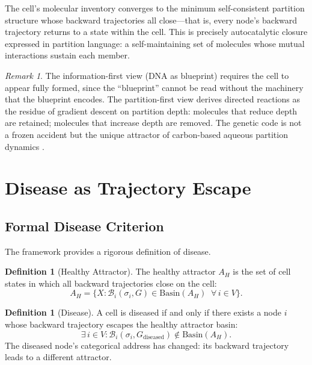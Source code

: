 \documentclass[twocolumn,10pt,a4paper]{article}
\theoremstyle{definition}
\newtheorem{definition}[theorem]{Definition}
\theoremstyle{remark}
\newtheorem{remark}[theorem]{Remark}
\newcommand{\Back}{\mathcal{B}}
\begin{document}
The cell's molecular inventory converges to the minimum self-consistent partition structure whose backward trajectories all close---that is, every node's backward trajectory returns to a state within the cell. This is precisely autocatalytic closure \citep{Kauffman1993,VarelaMaturanaUribe1974} expressed in partition language: a self-maintaining set of molecules whose mutual interactions sustain each member.

\begin{remark}
The information-first view (DNA as blueprint) requires the cell to appear fully formed, since the ``blueprint'' cannot be read without the machinery that the blueprint encodes. The partition-first view derives directed reactions as the residue of gradient descent on partition depth: molecules that reduce depth are retained; molecules that increase depth are removed. The genetic code is not a frozen accident but the unique attractor of carbon-based aqueous partition dynamics \citep{Sachikonye2024c}.
\end{remark}

\section{Disease as Trajectory Escape}
\label{sec:disease}

\subsection{Formal Disease Criterion}

The framework provides a rigorous definition of disease.

\begin{definition}[Healthy Attractor]
\label{def:healthy}
The healthy attractor $A_H$ is the set of cell states in which all backward trajectories close on the cell:
\begin{equation}
    A_H = \{X : \Back_i(\sigma_i, G) \in \mathrm{Basin}(A_H) \;\; \forall \, i \in V\}.
\end{equation}
\end{definition}

\begin{definition}[Disease]
\label{def:disease}
A cell is diseased if and only if there exists a node $i$ whose backward trajectory escapes the healthy attractor basin:
\begin{equation}
    \exists \, i \in V : \Back_i(\sigma_i, G_{\mathrm{diseased}}) \notin \mathrm{Basin}(A_H).
    \label{eq:disease}
\end{equation}
The diseased node's categorical address has changed: its backward trajectory leads to a different attractor.
\end{definition}
\end{document}
